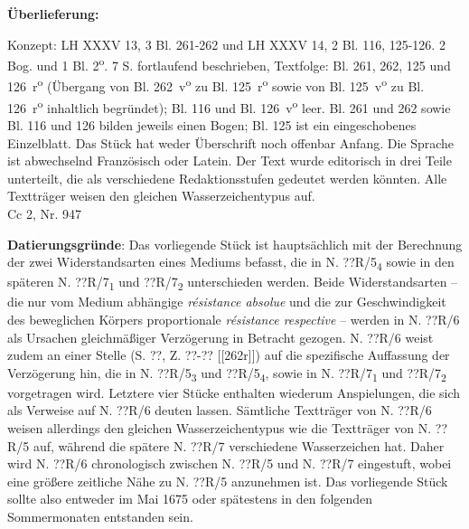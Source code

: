\begin{ledgroupsized}[r]{120mm}
\footnotesize
\pstart
\noindent\textbf{\"{U}berlieferung:}
\pend
\end{ledgroupsized}
\begin{ledgroupsized}[r]{114mm}
\footnotesize
\pstart \parindent -6mm
Konzept: LH XXXV 13, 3 Bl. 261-262 und LH XXXV 14, 2 Bl. 116, 125-126. 2 Bog. und 1 Bl. 2\textsuperscript{o}. 7 S. fortlaufend beschrieben, Textfolge: Bl. 261, 262, 125 und 126~r\textsuperscript{o} (\"{U}bergang von Bl. 262~v\textsuperscript{o} zu Bl. 125~r\textsuperscript{o} sowie von Bl. 125~v\textsuperscript{o} zu Bl. 126~r\textsuperscript{o} inhaltlich begr\"{u}ndet); Bl. 116 und Bl. 126~v\textsuperscript{o} leer. Bl. 261 und 262 sowie Bl. 116 und 126 bilden jeweils einen Bogen; Bl. 125 ist ein eingeschobenes Einzelblatt. Das St\"{u}ck hat weder \"{U}berschrift noch offenbar Anfang. Die Sprache ist abwechselnd Franz\"{o}sisch oder Latein. Der Text wurde editorisch in drei Teile unterteilt, die als verschiedene Redaktionsstufen gedeutet werden k\"{o}nnten. Alle Texttr\"{a}ger weisen den gleichen Wasserzeichentypus auf. \\Cc 2, Nr. 947
\pend
\end{ledgroupsized}
\vspace*{5mm}
\begin{ledgroup}
\footnotesize 
\pstart
\noindent\footnotesize{\textbf{Datierungsgr\"{u}nde}: Das vorliegende St\"{u}ck ist haupts\"{a}chlich mit der Berechnung der zwei Widerstands\-arten eines Mediums befasst, die in N. ??R/5\textsubscript{4} sowie in den sp\"{a}teren N. ??R/7\textsubscript{1} und ??R/7\textsubscript{2} unterschieden werden. Beide Widerstandsarten -- die nur vom Medium abh\"{a}ngige \textit{r\'{e}sistance absolue} und die zur Geschwindigkeit des beweglichen K\"{o}rpers proportionale \textit{r\'{e}sistance respective} -- werden in N. ??R/6 als Ursachen gleichm\"{a}{\ss}iger Verz\"{o}gerung in Betracht gezogen. N. ??R/6 weist zudem an einer Stelle (S. ??, Z. ??-?? [[262r]]) auf die spezifische Auffassung der Verz\"{o}gerung hin, die in N. ??R/5\textsubscript{3} und ??R/5\textsubscript{4}, sowie in N. ??R/7\textsubscript{1} und ??R/7\textsubscript{2} vorgetragen wird. Letztere vier St\"{u}cke enthalten wiederum Anspielungen, die sich als Verweise auf N. ??R/6 deuten lassen. S\"{a}mtliche Texttr\"{a}ger von N. ??R/6 weisen allerdings den gleichen Wasserzeichentypus wie die Texttr\"{a}ger von N. ??R/5 auf, w\"{a}hrend die sp\"{a}tere N. ??R/7 verschiedene Wasserzeichen hat. Daher wird N. ??R/6 chronologisch zwischen N. ??R/5 und N. ??R/7 eingestuft, wobei eine gr\"{o}{\ss}ere zeitliche N\"{a}he zu N. ??R/5 anzunehmen ist. Das vorliegende St\"{u}ck sollte also entweder im Mai 1675 oder sp\"{a}testens in den folgenden Sommermonaten entstanden sein.}
\pend
\end{ledgroup}
